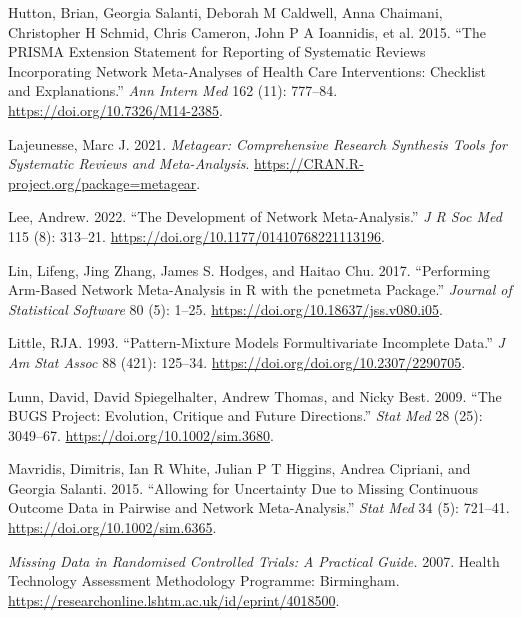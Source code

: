 \begin{CSLReferences}{1}{0}
\leavevmode{}%
Hutton, Brian, Georgia Salanti, Deborah M Caldwell, Anna Chaimani, Christopher H Schmid, Chris Cameron, John P A Ioannidis, et al. 2015. {``The PRISMA Extension Statement for Reporting of Systematic Reviews Incorporating Network Meta-Analyses of Health Care Interventions: Checklist and Explanations.''} \emph{Ann Intern Med} 162 (11): 777--84. \url{https://doi.org/10.7326/M14-2385}.

\leavevmode{}%
Lajeunesse, Marc J. 2021. \emph{Metagear: Comprehensive Research Synthesis Tools for Systematic Reviews and Meta-Analysis}. \url{https://CRAN.R-project.org/package=metagear}.

\leavevmode{}%
Lee, Andrew. 2022. {``The Development of Network Meta-Analysis.''} \emph{J R Soc Med} 115 (8): 313--21. \url{https://doi.org/10.1177/01410768221113196}.

\leavevmode{}%
Lin, Lifeng, Jing Zhang, James S. Hodges, and Haitao Chu. 2017. {``Performing Arm-Based Network Meta-Analysis in {R} with the {pcnetmeta} Package.''} \emph{Journal of Statistical Software} 80 (5): 1--25. \url{https://doi.org/10.18637/jss.v080.i05}.

\leavevmode{}%
Little, RJA. 1993. {``Pattern-Mixture Models Formultivariate Incomplete Data.''} \emph{J Am Stat Assoc} 88 (421): 125--34. \url{https://doi.org/doi.org/10.2307/2290705}.

\leavevmode{}%
Lunn, David, David Spiegelhalter, Andrew Thomas, and Nicky Best. 2009. {``The BUGS Project: Evolution, Critique and Future Directions.''} \emph{Stat Med} 28 (25): 3049--67. \url{https://doi.org/10.1002/sim.3680}.

\leavevmode{}%
Mavridis, Dimitris, Ian R White, Julian P T Higgins, Andrea Cipriani, and Georgia Salanti. 2015. {``Allowing for Uncertainty Due to Missing Continuous Outcome Data in Pairwise and Network Meta-Analysis.''} \emph{Stat Med} 34 (5): 721--41. \url{https://doi.org/10.1002/sim.6365}.

\leavevmode{}%
\emph{Missing Data in Randomised Controlled Trials: A Practical Guide.} 2007. Health Technology Assessment Methodology Programme: Birmingham. \url{https://researchonline.lshtm.ac.uk/id/eprint/4018500}.


\end{CSLReferences}
